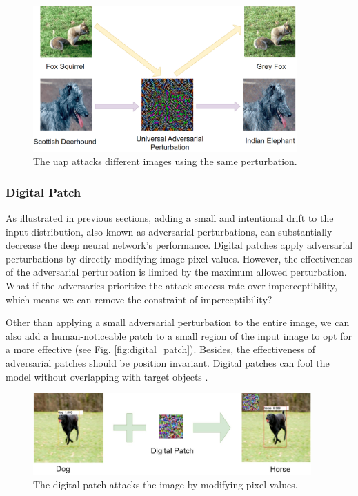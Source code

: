 \begin{figure}[H]
\centering
\includegraphics[width=0.9\textwidth]{figures/chapter_intro/uap.png}
\caption{The \acrfull{uap} attacks different images using the same perturbation.}
\label{fig.uap}
\end{figure}


\subsubsection{Digital Patch}

As illustrated in previous sections, adding a small and intentional drift to the input distribution, also known as adversarial perturbations, can substantially decrease the deep neural network's performance. Digital patches apply adversarial perturbations by directly modifying image pixel values. However, the effectiveness of the adversarial perturbation is limited by the maximum allowed perturbation. What if the adversaries prioritize the attack success rate over imperceptibility, which means we can remove the constraint of imperceptibility?

Other than applying a small adversarial perturbation to the entire image, we can also add a human-noticeable patch to a small region of the input image to opt for a more effective (see Fig. \ref{fig:digital_patch}). Besides, the effectiveness of adversarial patches should be position invariant. Digital patches can fool the model without overlapping with target objects \citep{saha2019adversarial}.


\begin{figure}[H]
\centering
\includegraphics[width=0.95\textwidth]{figures/chapter_intro/digital_patch.jpg}
\caption{The digital patch attacks the image by modifying pixel values.}
\label{fig.digital_patch}
\end{figure}


